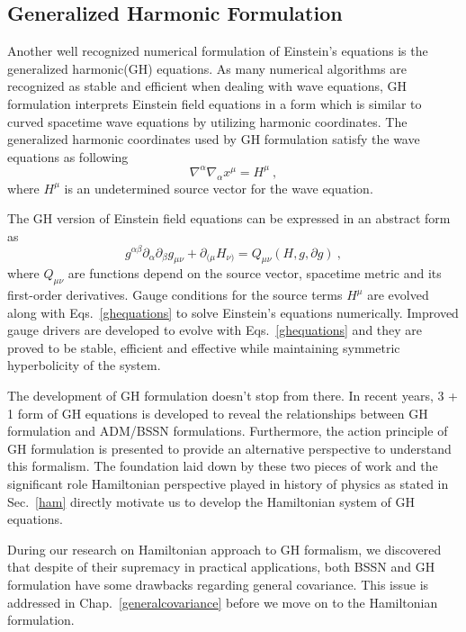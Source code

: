 \subsection{Generalized Harmonic Formulation}
Another well recognized numerical formulation of Einstein's equations is the generalized harmonic(GH) equations\cite{Friedrich:1985, Garfinkle:2001ni, Pretorius:2006tp}. As many numerical algorithms are recognized as stable and efficient when dealing with wave equations, GH formulation interprets Einstein field equations in a form which is similar to curved spacetime wave equations by utilizing harmonic coordinates. The generalized harmonic coordinates used by GH formulation satisfy the wave equations as following
\begin{equation}
	\nabla^{\alpha}\nabla_{\alpha}x^{\mu} = H^{\mu} \ ,
\end{equation}
where $H^{\mu}$ is an undetermined source vector for the wave equation. 

The GH version of Einstein field equations can be expressed in an abstract form as
\begin{equation}\label{ghequations}
	g^{\alpha\beta}\partial_{\alpha}\partial_{\beta}g_{\mu\nu} + \partial_{(\mu}H_{\nu)} = Q_{\mu\nu}(H, g, \partial g) \ , 
\end{equation}
where $Q_{\mu\nu}$ are functions depend on the source vector, spacetime metric and its first-order derivatives. Gauge conditions for the source terms $H^{\mu}$ are evolved along with Eqs.~\ref{ghequations} to solve Einstein's equations numerically. Improved gauge drivers are developed to evolve with Eqs.~\ref{ghequations} and they are proved to be stable, efficient and effective while maintaining symmetric hyperbolicity of the system\cite{Lindblom:2007xw, Lindblom:2009tu}. 

The development of GH formulation doesn't stop from there. In recent years, 3 + 1 form of GH equations\cite{Brown:2011qg} is developed
to reveal the relationships between GH formulation and ADM/BSSN formulations. Furthermore, the action principle of GH formulation\cite{Brown:2010rya} is presented to provide an alternative perspective to understand this formalism. The foundation laid down by these two pieces of work and the significant role Hamiltonian perspective played in history of physics as stated in Sec.~\ref{ham} directly motivate us to develop the Hamiltonian system of GH equations. 

During our research on Hamiltonian approach to GH formalism, we discovered that despite of their supremacy in practical applications, both BSSN and GH formulation have some drawbacks regarding general covariance. This issue is addressed in Chap.~\ref{generalcovariance} before we move on to the Hamiltonian formulation. 

